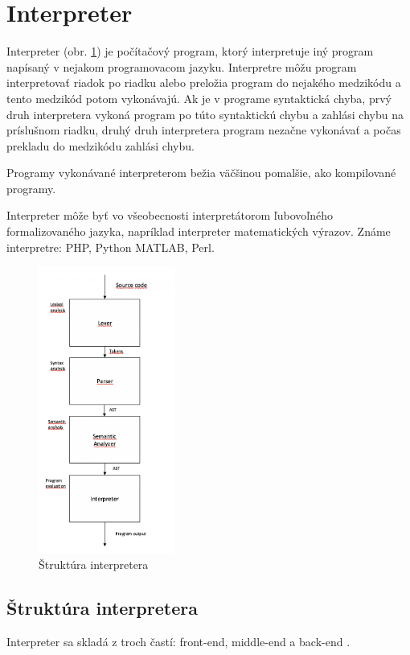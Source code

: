 \section{Interpreter}
Interpreter (obr. \ref{obr:intepreter}) je počítačový program, ktorý interpretuje iný program napísaný 
v nejakom programovacom jazyku. Interpretre môžu program interpretovať riadok 
po riadku alebo preložia program do nejakého medzikódu a tento medzikód potom vykonávajú. 
Ak je v programe syntaktická chyba, prvý druh interpretera vykoná program po túto syntaktickú 
chybu a zahlási chybu na príslušnom riadku, druhý druh interpretera program nezačne vykonávať a
počas prekladu do medzikódu zahlási chybu.

Programy vykonávané interpreterom bežia väčšinou pomalšie, ako kompilované programy.

Interpreter môže byť vo všeobecnosti interpretátorom ľubovoľného formalizovaného jazyka, 
napríklad interpreter matematických výrazov. Známe interpretre: PHP, Python MATLAB, Perl.


\begin{figure}[H]
\centerline{\includegraphics[width=0.4\textwidth]{images/intepreter}}
\caption[intepreter]{Štruktúra interpretera}
\label{obr:intepreter}
\end{figure}

\subsection{Štruktúra interpretera}
Interpreter sa skladá z troch častí: front-end, middle-end a back-end \cite{br3}.

